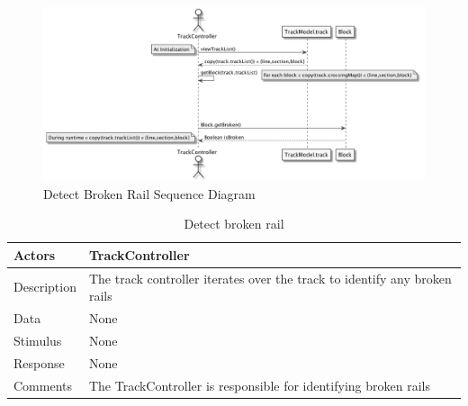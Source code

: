 \documentclass[]{article}
\begin{document}
\begin{figure}[H]
	\centering
	\includegraphics[width=\textwidth]{detectBroken.png}
	\caption{Detect Broken Rail Sequence Diagram}
\end{figure}

\begin{table}[H]
	\centering
	\caption{Detect broken rail}
	\begin{tabular}{|l|l|}
		\hline
		Actors & \parbox[t]{10cm}{TrackController} \\ \hline
		Description & \parbox[t]{10cm}{The track controller iterates over the track to identify any broken rails} \\ \hline
		Data &  \parbox[t]{10cm}{None} \\ \hline
		Stimulus &  \parbox[t]{10cm}{None} \\ \hline
		Response & \parbox[t]{10cm}{None}\\ \hline
		Comments & \parbox[t]{10cm}{The TrackController is responsible for identifying broken rails}  \\ \hline
	\end{tabular}
\end{table}
\end{document}
